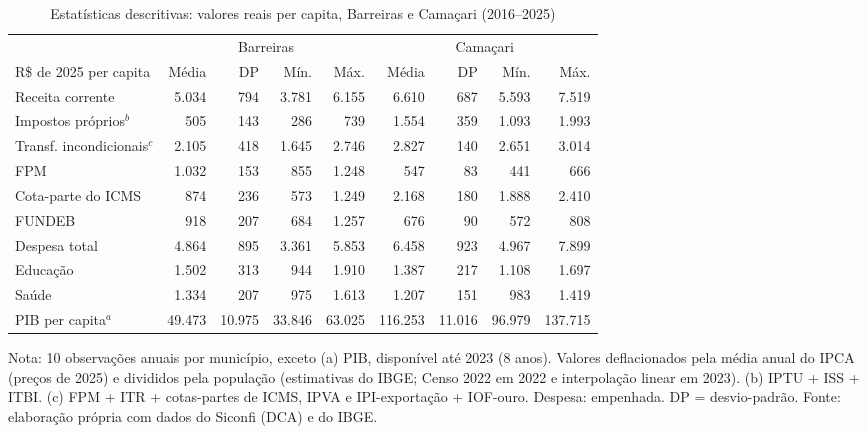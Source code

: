 \begin{table}[H]
\centering\footnotesize
\setlength{\tabcolsep}{4pt}
\caption{Estatísticas descritivas: valores reais per capita, Barreiras e Camaçari (2016--2025)}
\label{tab:descritivas}
\begin{adjustbox}{max width=\textwidth}
\begin{tabular}{lrrrrrrrr}
\toprule
 & \multicolumn{4}{c}{Barreiras} & \multicolumn{4}{c}{Camaçari} \\
\cmidrule(lr){2-5}\cmidrule(lr){6-9}
R\$ de 2025 per capita & Média & DP & Mín. & Máx. & Média & DP & Mín. & Máx. \\
\midrule
Receita corrente & 5.034 & 794 & 3.781 & 6.155 & 6.610 & 687 & 5.593 & 7.519 \\
Impostos próprios$^{b}$ & 505 & 143 & 286 & 739 & 1.554 & 359 & 1.093 & 1.993 \\
Transf. incondicionais$^{c}$ & 2.105 & 418 & 1.645 & 2.746 & 2.827 & 140 & 2.651 & 3.014 \\
\quad FPM & 1.032 & 153 & 855 & 1.248 & 547 & 83 & 441 & 666 \\
\quad Cota-parte do ICMS & 874 & 236 & 573 & 1.249 & 2.168 & 180 & 1.888 & 2.410 \\
FUNDEB & 918 & 207 & 684 & 1.257 & 676 & 90 & 572 & 808 \\
Despesa total & 4.864 & 895 & 3.361 & 5.853 & 6.458 & 923 & 4.967 & 7.899 \\
\quad Educação & 1.502 & 313 & 944 & 1.910 & 1.387 & 217 & 1.108 & 1.697 \\
\quad Saúde & 1.334 & 207 & 975 & 1.613 & 1.207 & 151 & 983 & 1.419 \\
PIB per capita$^{a}$ & 49.473 & 10.975 & 33.846 & 63.025 & 116.253 & 11.016 & 96.979 & 137.715 \\
\bottomrule
\end{tabular}
\end{adjustbox}
\par\vspace{3pt}\parbox{\textwidth}{\scriptsize Nota: 10 observações anuais por município, exceto (a) PIB, disponível até 2023 (8 anos). Valores deflacionados pela média anual do IPCA (preços de 2025) e divididos pela população (estimativas do IBGE; Censo 2022 em 2022 e interpolação linear em 2023). (b) IPTU + ISS + ITBI. (c) FPM + ITR + cotas-partes de ICMS, IPVA e IPI-exportação + IOF-ouro. Despesa: empenhada. DP = desvio-padrão. Fonte: elaboração própria com dados do Siconfi (DCA) e do IBGE.}
\end{table}
